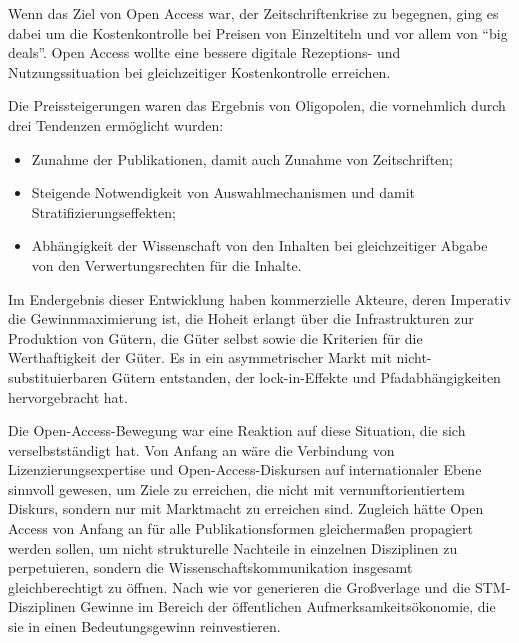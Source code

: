 \documentclass[a4paper,
fontsize=11pt,
oneside,
numbers=noperiodatend,
parskip=half-,
bibliography=totoc,
final
]{scrartcl}
\begin{document}
Wenn das Ziel von Open Access war, der Zeitschriftenkrise zu begegnen,
ging es dabei um die Kostenkontrolle bei Preisen von Einzeltiteln und
vor allem von \enquote{big deals}. Open Access wollte eine bessere
digitale Rezeptions- und Nutzungssituation bei gleichzeitiger
Kostenkontrolle erreichen.

Die Preissteigerungen waren das Ergebnis von Oligopolen, die vornehmlich
durch drei Tendenzen ermöglicht wurden:

\begin{itemize}
\item
  Zunahme der Publikationen, damit auch Zunahme von Zeitschriften;
\item
  Steigende Notwendigkeit von Auswahlmechanismen und damit
  Stratifizierungseffekten;
\item
  Abhängigkeit der Wissenschaft von den Inhalten bei gleichzeitiger
  Abgabe von den Verwertungsrechten für die Inhalte.
\end{itemize}

Im Endergebnis dieser Entwicklung haben kommerzielle Akteure, deren
Imperativ die Gewinnmaximierung ist, die Hoheit erlangt über die
Infrastrukturen zur Produktion von Gütern, die Güter selbst sowie die
Kriterien für die Werthaftigkeit der Güter. Es in ein asymmetrischer
Markt mit nicht-substituierbaren Gütern entstanden, der lock-in-Effekte
und Pfadabhängigkeiten hervorgebracht hat.

Die Open-Access-Bewegung war eine Reaktion auf diese Situation, die sich
verselbstständigt hat. Von Anfang an wäre die Verbindung von
Lizenzierungsexpertise und Open-Access-Diskursen auf internationaler
Ebene sinnvoll gewesen, um Ziele zu erreichen, die nicht mit
vernunftorientiertem Diskurs, sondern nur mit Marktmacht zu erreichen
sind. Zugleich hätte Open Access von Anfang an für alle
Publikationsformen gleichermaßen propagiert werden sollen, um nicht
strukturelle Nachteile in einzelnen Disziplinen zu perpetuieren, sondern
die Wissenschaftskommunikation insgesamt gleichberechtigt zu öffnen.
Nach wie vor generieren die Großverlage und die STM-Disziplinen Gewinne
im Bereich der öffentlichen Aufmerksamkeitsökonomie, die sie in einen
Bedeutungsgewinn reinvestieren.
\end{document}

